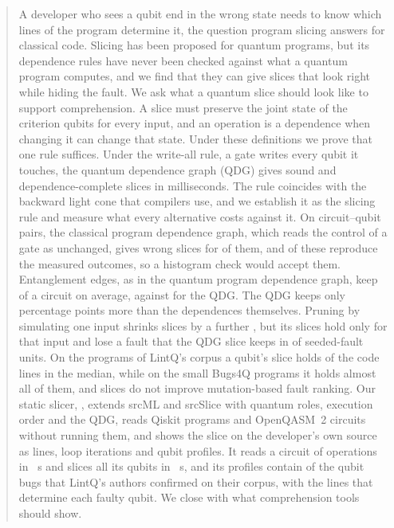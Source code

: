 \begin{abstract}
A developer who sees a qubit end in the wrong state needs to know which lines of the program determine it,
the question program slicing answers for classical code. Slicing has been proposed for quantum programs,
but its dependence rules have never been checked against what a quantum program computes, and we find
that they can give slices that look right while hiding the fault. We ask what a quantum slice should look
like to support comprehension. A slice must preserve the joint state of the criterion qubits for every
input, and an operation is a dependence when changing it can change that state. Under these definitions
we prove that one rule suffices. Under the write-all rule, a gate writes every qubit it touches, the
quantum dependence graph (QDG) gives sound and dependence-complete slices in milliseconds. The rule coincides
with the backward light cone that compilers use, and we establish it as the slicing rule and measure what
every alternative costs against it. On
\numNPairs{} circuit--qubit pairs, the classical program dependence graph, which reads the control of a
gate as unchanged, gives wrong slices for \numCpdgUnsoundPct{} of them, and \numFdCpdgZMatchPct{} of these
reproduce the measured outcomes, so a histogram check would accept them. Entanglement edges, as in the
quantum program dependence graph, keep \numRqOneYzSize{} of a circuit on average, against
\numRqOneLcSize{} for the QDG. The QDG keeps only \numLcExcess{} percentage points more than the dependences
themselves.
Pruning by simulating one input shrinks slices by a further \numHTwoRelative{}, but its slices hold only
for that input and lose a fault that the QDG slice keeps in \numCQFour{} of \numRqThreeUnits{}
seeded-fault units. On the programs of LintQ's corpus a qubit's slice holds \numScaleReadMedianPct{} of the
code lines in the median, while on the small Bugs4Q programs it holds almost all of them, and slices do not
improve mutation-based fault ranking. Our static slicer, \tool{}, extends srcML and srcSlice with quantum roles, execution order and the
QDG, reads Qiskit programs and OpenQASM~2 circuits without running them, and shows the slice on the developer's own
source as lines, loop iterations and qubit profiles. It reads a circuit of \numScaleQbMaxOps{} operations in
\numScaleQbReadS{}~s and slices all its qubits in \numScaleQbAllS{}~s, and its profiles contain \numLqQubitExposed{} of the \numLqQubitTp{} qubit bugs
that LintQ's authors confirmed on their corpus, with the lines that determine each faulty qubit. We close with what comprehension tools should show.
\end{abstract}
